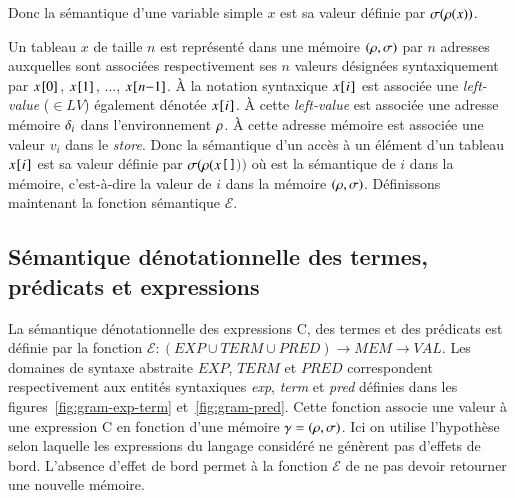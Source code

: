 Donc la sémantique d'une variable simple $x$ est sa valeur définie par
$\sigma(\rho(x))$.

Un tableau $x$ de taille $n$ est représenté dans une mémoire $(\rho, \sigma)$
par $n$ adresses auxquelles sont associées respectivement ses $n$ valeurs
désignées syntaxiquement par $x\mbox{\lstinline'[0]'}$,
$x\mbox{\lstinline'[1]'}$, ..., $x\mbox{\lstinline'['}n\mbox{\lstinline'-1]'}$.
À la notation syntaxique $x\mbox{\lstinline'['}i\mbox{\lstinline']'}$ est
associée une {\em left-value} ($\in LV$) également dénotée
$x\mbox{\lstinline'['}i\mbox{\lstinline']'}$.
À cette {\em left-value} est associée une adresse mémoire $\delta_i$ dans
l'environnement $\rho$.
À cette adresse mémoire est associée une valeur $v_i$ dans le {\em store}.
Donc la sémantique d'un accès à un élément d'un tableau
$x\mbox{\lstinline'['}i\mbox{\lstinline']'}$ est sa valeur définie par
$\sigma(\rho(x$\lstinline'['\lstinline']'$))$ où
 est la sémantique de $i$ dans la mémoire,
c'est-à-dire la valeur de $i$ dans la mémoire $(\rho, \sigma)$.
Définissons maintenant la fonction sémantique $\mathcal{E}$.


\subsection{Sémantique dénotationnelle des termes, prédicats et expressions}



La sémantique dénotationnelle des expressions C, des termes et des prédicats
\eacsl est définie par la fonction
$\mathcal{E} : (EXP \cup TERM \cup PRED) \rightarrow MEM \rightarrow VAL$.
Les domaines de syntaxe abstraite $EXP$, $TERM$ et $PRED$ correspondent
respectivement aux entités syntaxiques \textit{exp}, \textit{term} et
\textit{pred} définies dans les figures~\ref{fig:gram-exp-term}
et~\ref{fig:gram-pred}.
Cette fonction associe une valeur à une expression C en fonction d'une mémoire
$\gamma = (\rho, \sigma)$.
Ici on utilise l'hypothèse selon laquelle les expressions du langage considéré
ne génèrent pas d'effets de bord.
L'absence d'effet de bord permet à la fonction $\mathcal{E}$ de ne pas devoir
retourner une nouvelle mémoire.

